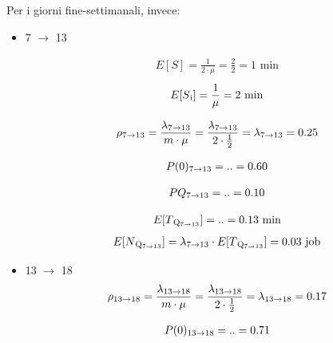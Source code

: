 \documentclass[a4paper, 12pt]{article}
\begin{document}
\bigskip
Per i giorni fine-settimanali, invece:
\begin{itemize}
  \item 7 $\rightarrow$ 13

\[
\begin{aligned}
  E[S] = \frac{1}{2 \cdot \mu} = \frac{2}{2} = 1 \text{ min} 
\end{aligned}
\]
\[
\begin{aligned}
  E[S\textsubscript{i}] = \frac{1}{\mu} = 2 \text{ min}
\end{aligned}
\]


\[
\begin{aligned}
  \rho\textsubscript{7$\rightarrow$13} = \frac{\lambda\textsubscript{7$\rightarrow$13}}{m \cdot \mu}
= \frac{\lambda\textsubscript{7$\rightarrow$13}}{2 \cdot \frac{1}{2}} =\lambda\textsubscript{7$\rightarrow$13} = 0.25
\end{aligned}
\]

\[
\begin{aligned}
  P(0)\textsubscript{7$\rightarrow$13} = .. = 0.60 
\end{aligned}
\]

\[
\begin{aligned}
  PQ\textsubscript{7$\rightarrow$13} = .. = 0.10 
\end{aligned}
\]

\[
\begin{aligned}
  E[T\textsubscript{Q\textsubscript{7$\rightarrow$13}}] = .. = 0.13 \text{ min} 
\end{aligned}
\]
\[
\begin{aligned}
  E[N\textsubscript{Q\textsubscript{7$\rightarrow$13}}] = \lambda\textsubscript{7$\rightarrow$13}
\cdot E[T\textsubscript{Q\textsubscript{7$\rightarrow$13}}] = 0.03 \text{ job} 
\end{aligned}
\]


\item 13 $\rightarrow$ 18
\[
\begin{aligned}
  \rho\textsubscript{13$\rightarrow$18} = \frac{\lambda\textsubscript{13$\rightarrow$18}}{m \cdot \mu}
= \frac{\lambda\textsubscript{13$\rightarrow$18}}{2 \cdot \frac{1}{2}} =\lambda\textsubscript{13$\rightarrow$18} = 0.17
\end{aligned}
\]

\[
\begin{aligned}
  P(0)\textsubscript{13$\rightarrow$18} = .. = 0.71 
\end{aligned}
\]


\end{itemize}
\end{document}

